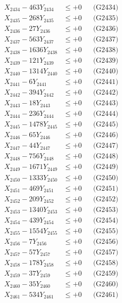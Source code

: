 \documentclass[a4paper,10pt]{article}
\begin{document}
{\begin{align}
X_{2434} - 463Y_{2434} &\leq +0 && \text{(G2434)} \\
X_{2435} - 268Y_{2435} &\leq +0 && \text{(G2435)} \\
X_{2436} - 27Y_{2436} &\leq +0 && \text{(G2436)} \\
X_{2437} - 563Y_{2437} &\leq +0 && \text{(G2437)} \\
X_{2438} - 1636Y_{2438} &\leq +0 && \text{(G2438)} \\
X_{2439} - 121Y_{2439} &\leq +0 && \text{(G2439)} \\
X_{2440} - 1314Y_{2440} &\leq +0 && \text{(G2440)} \\
\allowbreak
X_{2441} - 6Y_{2441} &\leq +0 && \text{(G2441)} \\
X_{2442} - 394Y_{2442} &\leq +0 && \text{(G2442)} \\
X_{2443} - 18Y_{2443} &\leq +0 && \text{(G2443)} \\
X_{2444} - 236Y_{2444} &\leq +0 && \text{(G2444)} \\
X_{2445} - 1478Y_{2445} &\leq +0 && \text{(G2445)} \\
X_{2446} - 65Y_{2446} &\leq +0 && \text{(G2446)} \\
X_{2447} - 44Y_{2447} &\leq +0 && \text{(G2447)} \\
X_{2448} - 756Y_{2448} &\leq +0 && \text{(G2448)} \\
X_{2449} - 1671Y_{2449} &\leq +0 && \text{(G2449)} \\
X_{2450} - 1333Y_{2450} &\leq +0 && \text{(G2450)} \\
\allowbreak
X_{2451} - 469Y_{2451} &\leq +0 && \text{(G2451)} \\
X_{2452} - 209Y_{2452} &\leq +0 && \text{(G2452)} \\
X_{2453} - 1340Y_{2453} &\leq +0 && \text{(G2453)} \\
X_{2454} - 439Y_{2454} &\leq +0 && \text{(G2454)} \\
X_{2455} - 1554Y_{2455} &\leq +0 && \text{(G2455)} \\
X_{2456} - 7Y_{2456} &\leq +0 && \text{(G2456)} \\
X_{2457} - 57Y_{2457} &\leq +0 && \text{(G2457)} \\
X_{2458} - 178Y_{2458} &\leq +0 && \text{(G2458)} \\
X_{2459} - 37Y_{2459} &\leq +0 && \text{(G2459)} \\
X_{2460} - 35Y_{2460} &\leq +0 && \text{(G2460)} \\
\allowbreak
X_{2461} - 534Y_{2461} &\leq +0 && \text{(G2461)} \\

\end{align}}
\end{document}

